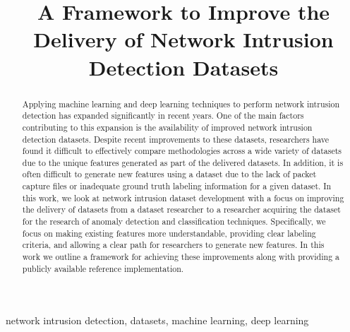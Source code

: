 \documentclass[conference]{IEEEtran}
\begin{document}
\title{A Framework to Improve the Delivery of Network Intrusion Detection Datasets}

\author{
\and
{}
}

\maketitle

\begin{abstract}
    Applying machine learning and deep learning techniques to perform network intrusion detection has expanded significantly in recent years.
    One of the main factors contributing to this expansion is the availability of improved network intrusion detection datasets.
    Despite recent improvements to these datasets, researchers have found it difficult to effectively compare methodologies across a wide variety of datasets due to the unique features generated as part of the delivered datasets.
    In addition, it is often difficult to generate new features using a dataset due to the lack of packet capture files or inadequate ground truth labeling information for a given dataset.
    In this work, we look at network intrusion dataset development with a focus on improving the delivery of datasets from a dataset researcher to a researcher acquiring the dataset for the research of anomaly detection and classification techniques.
    Specifically, we focus on making existing features more understandable, providing clear labeling criteria, and allowing a clear path for researchers to generate new features.
    In this work we outline a framework for achieving these improvements along with providing a publicly available reference implementation.
\end{abstract}

\begin{IEEEkeywords}
network intrusion detection, datasets, machine learning, deep learning
\end{IEEEkeywords}
\end{document}
